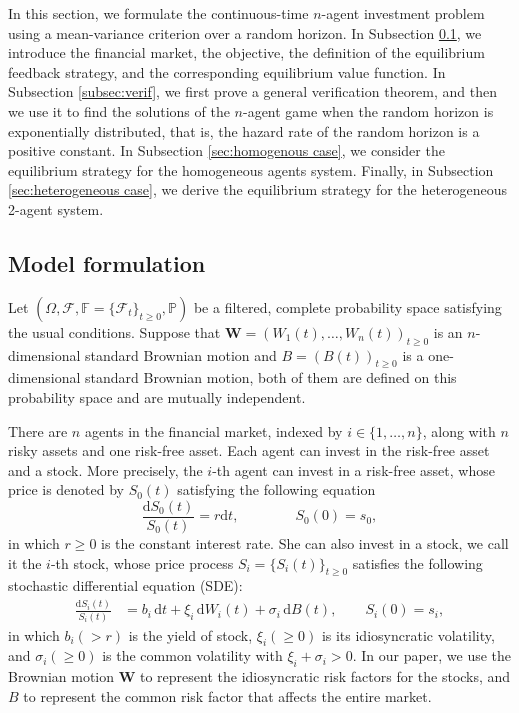 \documentclass[11pt]{article}
\newcommand \drm {\mathrm{d}}
\numberwithin{equation}{section}
\begin{document}
	In this section, we formulate the continuous-time $n$-agent investment problem using a mean-variance criterion over a random horizon. In Subsection \ref{subsec:model}, we introduce the financial market, the objective, the definition of the equilibrium feedback strategy, and the corresponding equilibrium value function. In Subsection \ref{subsec:verif}, we first prove a general verification theorem, and then we use it to find the solutions of the $n$-agent game when the random horizon is exponentially distributed, that is, the hazard rate of the random horizon is a positive constant.  In Subsection
	\ref{sec:homogenous case}, we consider the equilibrium strategy for the homogeneous agents system. Finally, in Subsection
	\ref{sec:heterogeneous case}, we derive the equilibrium strategy for the heterogeneous 2-agent system.
	
	\subsection{Model formulation}\label{subsec:model}
	
	Let \((\Omega, \mathcal{F}, \mathbb{F}=\{\mathcal{F}_t\}_{t \geq 0}, \mathbb{P})\) be a filtered, complete probability space satisfying the usual conditions. Suppose that \(\bm{W}=(W_1(t),\ldots,W_n(t))_{t \geq 0}\) is an \(n\)-dimensional standard Brownian motion and \(B=(B(t))_{t \geq 0}\) is a one-dimensional standard Brownian motion, both of them are defined on this probability space and are mutually independent.
	
	There are \(n\) agents in the financial market, indexed by \(i\in\{1,\ldots,n\}\), along with \(n\) risky assets and one risk-free asset. Each agent can invest in the risk-free asset and a stock. More precisely,
	the $i$-th agent can invest in a risk-free asset, whose price is denoted by $S_0(t)$ satisfying the following equation
	\begin{equation}
		\frac{\mathrm{d}S_0(t) }{S_0(t)}=r\mathrm{d}t,  \qquad \qquad S_0(0) = s_0,
	\end{equation}
	in which $r \ge 0$ is the constant interest rate. She can also invest in a stock, we call it the $i$-th stock, whose price process $S_i= \{S_i(t)\}_{t \ge 0}$ satisfies the following stochastic differential equation (SDE):
	\begin{align}
		\frac{\drm S_i (t)}{S_i (t)} &= b_i \, \drm t + \xi_i \, \drm W_i (t) + \sigma_i \, \drm B(t), \quad\quad S_i(0) = s_i,
	\end{align}
	in which \(b_i (>r)\) is the yield of stock, \(\xi_i (\ge 0)\) is its idiosyncratic volatility, and \(\sigma_i (\ge 0)\) is the common volatility with $\xi_i + \sigma_i>0$.
	In our paper, we use the Brownian motion \(\bm{W}\) to represent the idiosyncratic risk factors for the stocks, and \(B\) to represent the common risk factor that affects the entire market.
	
\end{document}
